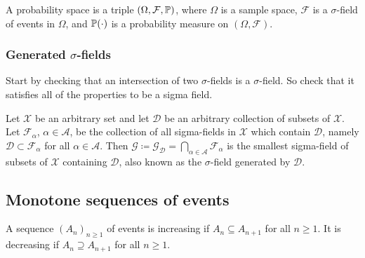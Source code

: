 \documentclass[10pt, a4paper]{article}
\begin{document}
\begin{definition}
    A probability space is a triple $(\Omega, \mathcal{F}, \P)$,
    where $\Omega$ is a sample space,
    $\mathcal{F}$ is a $\sigma$-field of events in $\Omega$,
    and $\P(\cdot)$ is a probability measure on $(\Omega, \mathcal{F})$.
\end{definition}

\subsubsection{Generated \texorpdfstring{$\sigma$}{}-fields}
Start by checking that an intersection of two $\sigma$-fields is a $\sigma$-field.
So check that it satisfies all of the properties to be a sigma field.

\begin{definition}
    Let $\mathcal{X}$ be an arbitrary set and let $\mathcal{D}$ be an arbitrary collection of subsets of $\mathcal{X}$.
    Let $\mathcal{F}_{\alpha}$,
    $\alpha \in \mathcal{A}$,
    be the collection of all sigma-fields in $\mathcal{X}$ which contain $\mathcal{D}$,
    namely $\mathcal{D} \subset \mathcal{F}_{\alpha}$ for all $\alpha \in \mathcal{A}$.
    Then $\mathcal{G} \coloneqq \mathcal{G}_{\mathcal{D}} = \bigcap_{\alpha \in \mathcal{A}}\mathcal{F}_{\alpha}$ is the smallest sigma-field of subsets of $\mathcal{X}$ containing $\mathcal{D}$,
    also known as the $\sigma$-field generated by $\mathcal{D}$.
\end{definition}

\subsection{Monotone sequences of events}

\begin{definition}
    A sequence $(A_n)_{n \geq 1}$ of events is increasing if $A_n \subseteq A_{n + 1}$ for all $n \geq 1$.
    It is decreasing if $A_n \supseteq A_{n + 1}$ for all $n \geq 1$.
\end{definition}
\end{document}
